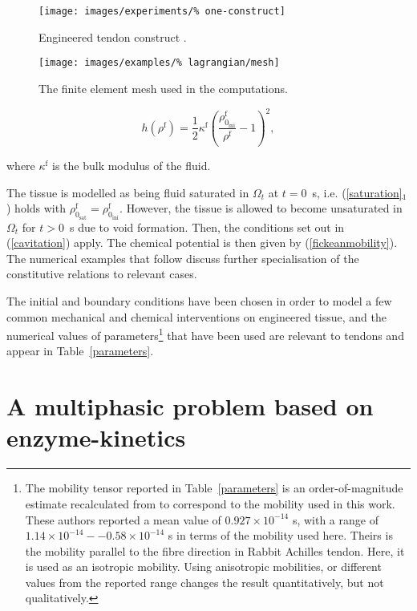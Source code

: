 \begin{figure}[ht]
  \centering
  \texttt{[image: images/experiments/\%
    one-construct]}
  \caption{Engineered tendon construct \citep{Calve:04}.}
  \label{engconst}
\end{figure}

\begin{figure}[ht]
  \centering
  \texttt{[image: images/examples/\%
    lagrangian/mesh]}
  \caption{The finite element mesh used in the computations.}
  \label{egmesh}
\end{figure}

\begin{equation}
 h(\rho^\mathrm{f}) =
\frac{1}{2}\kappa^\mathrm{f}\left(
\frac{\rho_{0_\mathrm{ini}}^\mathrm{f}}{\rho^\mathrm{f}}
- 1\right)^2,
\end{equation}

\noindent where $\kappa^\mathrm{f}$ is the bulk modulus of the fluid.

The tissue is modelled as being fluid saturated in $\Omega_t$ at $t =
0$~s, i.e. (\ref{saturation}$_1$) holds with $\rho^\mathrm{f} _
{0_\mathrm{sat}} = \rho^\mathrm{f} _ {0_\mathrm{ini}}$. However, the
tissue is allowed to become unsaturated in $\Omega_t$ for $t > 0$~s
due to void formation. Then, the conditions set out in
(\ref{cavitation}) apply. The chemical potential is then given by
(\ref{fickeanmobility}). The numerical examples that follow discuss
further specialisation of the constitutive relations to relevant
cases.

The initial and boundary conditions have been chosen in order to model
a few common mechanical and chemical interventions on engineered
tissue, and the numerical values of parameters\footnote{The mobility
  tensor reported in Table~\ref{parameters} is an order-of-magnitude
  estimate recalculated from \citet{Hanetal:2000} to correspond to the
  mobility used in this work. These authors reported a mean value of
  $0.927\times 10^{-14}$ s, with a range of $1.14\times
  10^{-14}--0.58\times 10^{-14}$ s in terms of the mobility used
  here. Theirs is the mobility parallel to the fibre direction in
  Rabbit Achilles tendon. Here, it is used as an isotropic
  mobility. Using anisotropic mobilities, or different values from the
  reported range changes the result quantitatively, but not
  qualitatively.} that have been used are relevant to tendons and
appear in Table~\ref{parameters}.

\section{A multiphasic problem based on enzyme-kinetics}
\label{enzyme-kinetics-example}

